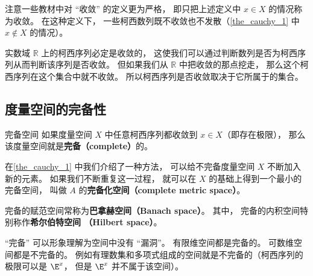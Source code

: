 注意一些教材中对 “收敛” 的定义更为严格， 即只把上述定义中 $x \in X$ 的情况称为收敛。 在这种定义下， 一些柯西数列既不收敛也不发散（\autoref{the_cauchy_1} 中 $x\notin X$ 的情况）。




实数域 $\mathbb R$ 上的柯西序列必定是收敛的， 这使我们可以通过判断数列是否为柯西序列从而判断该序列是否收敛。 但如果我们从 $\mathbb R$ 中把收敛的那点挖走， 那么这个柯西序列在这个集合中就不收敛。 所以柯西序列是否收敛取决于它所属于的集合。 %

\subsection{度量空间的完备性}

\begin{definition}{完备空间}
如果度量空间 $X$ 中任意柯西序列都收敛到 $x\in X$（即存在极限）， 那么该度量空间就是\textbf{完备（complete）}的。
\end{definition}

在\autoref{the_cauchy_1} 中我们介绍了一种方法， 可以给不完备度量空间 $X$ 不断加入新的元素。 如果我们不断重复这一过程， 就可以在 $X$ 的基础上得到一个最小的完备空间， 叫做 $A$ 的\textbf{完备化空间（complete metric space）}。


完备的赋范空间常称为\textbf{巴拿赫空间（Banach space）}。 其中， 完备的内积空间特别称作\textbf{希尔伯特空间 （Hilbert space）}。

“完备” 可以形象理解为空间中没有 “漏洞”。 有限维空间都是完备的。 可数维空间都是不完备的。 例如有理数集和多项式组成的空间就是不完备的（柯西序列的极限可以是 $\E^x$， 但是 $\E^x$ 并不属于该空间）。
